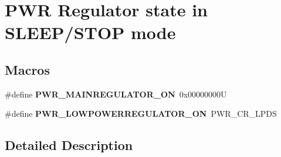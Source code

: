 \hypertarget{group___p_w_r___regulator__state__in___s_l_e_e_p___s_t_o_p__mode}{}\section{P\+WR Regulator state in S\+L\+E\+E\+P/\+S\+T\+OP mode}
\label{group___p_w_r___regulator__state__in___s_l_e_e_p___s_t_o_p__mode}
\subsection*{Macros}
\begin{DoxyCompactItemize}
\item 
\mbox{\label{group___p_w_r___regulator__state__in___s_l_e_e_p___s_t_o_p__mode_ga1d5b4e1482184286e28c16162f530039}} 
\#define {\bfseries P\+W\+R\+\_\+\+M\+A\+I\+N\+R\+E\+G\+U\+L\+A\+T\+O\+R\+\_\+\+ON}~0x00000000U
\item 
\mbox{\label{group___p_w_r___regulator__state__in___s_l_e_e_p___s_t_o_p__mode_gab9922a15f8414818d736d5e7fcace963}} 
\#define {\bfseries P\+W\+R\+\_\+\+L\+O\+W\+P\+O\+W\+E\+R\+R\+E\+G\+U\+L\+A\+T\+O\+R\+\_\+\+ON}~P\+W\+R\+\_\+\+C\+R\+\_\+\+L\+P\+DS
\end{DoxyCompactItemize}


\subsection{Detailed Description}
